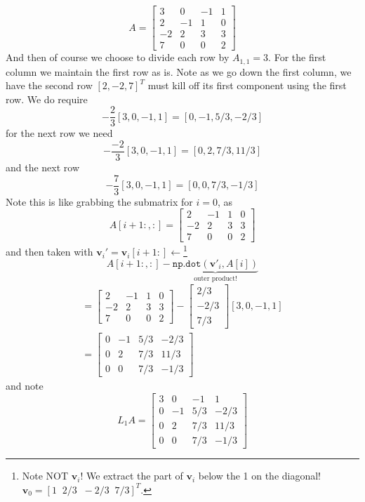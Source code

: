 \documentclass[12pt]{article}
\theoremstyle{definition}
\begin{document}
\begin{equation}
A=\left[\begin{array}{rrrr}
3 & 0 & -1 & 1 \\ 
2 & -1 & 1 & 0 \\ 
-2 & 2 & 3 & 3 \\ 
7 & 0 & 0 & 2
\end{array} \right]
\end{equation}
And then of course we choose to divide each row by $A_{1,1}=3$. For the first column we maintain the first row as is. Note as we go down the first column, we have the second row $[2,-2,7]^T$ must kill off its first component using the first row. We do  require 
\begin{equation}
[2,-1,1,0]-\frac{2}{3}[3, 0, -1, 1]=[0, -1, 5/3, -2/3]
\end{equation}
for the next row we need
\begin{equation}
[-2,2,3,3]-\frac{-2}{3}[3, 0, -1, 1]=[0, 2, 7/3, 11/3]
\end{equation}
and the next row 
\begin{equation}
[7,0,0,2]-\frac{7}{3}[3, 0, -1, 1]=[0, 0, 7/3, -1/3]
\end{equation}
Note this is like grabbing the submatrix for $i=0$, as
\begin{equation}
A[i+1: ,:]=\left[\begin{array}{rrrr}
2 & -1 & 1 & 0 \\ 
-2 & 2 & 3 & 3 \\ 
7 & 0 & 0 & 2
\end{array} \right]
\end{equation}
and then taken with $\mathbf{v}_i'=\mathbf{v}_i[i+1:]\leftarrow$\footnote{Note NOT $\mathbf{v}_i$! We extract the part of $\mathbf{v}_i$ below the 1 on the diagonal! $\mathbf{v}_0=[1\;\; 2/3\;\;-2/3\;\;7/3]^T$.}
\begin{equation}
A[i+1: ,:]- \underbrace{\texttt{np.dot}(\mathbf{v}'_i, A[i])}_{\text{outer product!}}
\end{equation}
\begin{align*}
=\left[\begin{array}{rrrr}
2 & -1 & 1 & 0 \\ 
-2 & 2 & 3 & 3 \\ 
7 & 0 & 0 & 2
\end{array} \right]- \left[\begin{array}{r}
2/3 \\ 
-2/3 \\ 
7/3
\end{array}\right] [3, 0, -1, 1]\\
=\left[\begin{array}{rrrr}
0 & -1 & 5/3 & -2/3 \\ 
0 & 2 & 7/3 & 11/3 \\ 
0 & 0 & 7/3 & -1/3
\end{array} \right] 
\end{align*}
and note
\begin{equation}
L_1A=\left[\begin{array}{rrrr}
3 & 0 & -1 & 1 \\
0 & -1 & 5/3 & -2/3 \\ 
0 & 2 & 7/3 & 11/3 \\ 
0 & 0 & 7/3 & -1/3
\end{array} \right] 
\end{equation}
\end{document}
